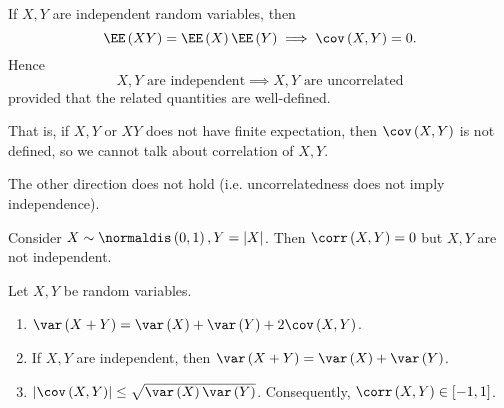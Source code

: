 \documentclass[stat901]{subfiles}
\begin{document}
    \np If $X,Y$ are independent random variables, then
    \begin{equation*}
        \EE\left( XY \right) = \EE\left( X \right)\EE\left( Y \right) \implies \cov\left( X,Y \right) = 0.
    \end{equation*}
    Hence
    \begin{equation*}
        \text{$X,Y$ are independent} \implies \text{$X,Y$ are uncorrelated}
    \end{equation*}
    provided that the related quantities are well-defined.
    
    That is, if $X,Y$ or $XY$ does not have finite expectation, then $\cov\left( X,Y \right)$ is not defined, so we cannot talk about correlation of $X,Y$. 

    The other direction does not hold (i.e. uncorrelatedness does not imply independence).

    \begin{example}{}
        Consider $X\sim\normaldis\left( 0,1 \right), Y = \left| X \right|$. Then $\corr\left( X,Y \right) = 0$ but $X,Y$ are not independent.
    \end{example}

    \rruleline
    
    \begin{theorem}{}
        Let $X,Y$ be random variables.
        \begin{enumerate}
            \item $\var\left( X+Y \right) = \var\left( X \right)+\var\left( Y \right)+2\cov\left( X,Y \right)$.
            \item If $X,Y$ are independent, then $\var\left( X+Y \right) = \var\left( X \right)+\var\left( Y \right)$.
            \item $\left| \cov\left( X,Y \right) \right|\leq \sqrt{\var\left( X \right)\var\left( Y \right)}$. Consequently, $\corr\left( X,Y \right)\in\left[ -1,1 \right]$.
        \end{enumerate}
    \end{theorem}
\end{document}
